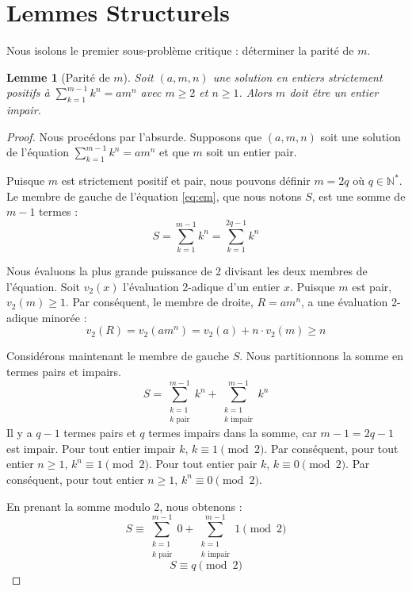 \documentclass[11pt,a4paper]{article}
\newtheorem{lemma}{Lemme}
\begin{document}
\section{Lemmes Structurels}

Nous isolons le premier sous-problème critique : déterminer la parité de $m$.

\begin{lemma}[Parité de $m$]
\label{lem:parity}
Soit $(a, m, n)$ une solution en entiers strictement positifs à $\sum_{k=1}^{m-1} k^n = a m^n$ avec $m \ge 2$ et $n \ge 1$. Alors $m$ doit être un entier impair.
\end{lemma}

\begin{proof}
Nous procédons par l'absurde. Supposons que $(a, m, n)$ soit une solution de l'équation $\sum_{k=1}^{m-1} k^n = a m^n$ et que $m$ soit un entier pair.

Puisque $m$ est strictement positif et pair, nous pouvons définir $m = 2q$ où $q \in \mathbb{N}^*$.
Le membre de gauche de l'équation \eqref{eq:em}, que nous notons $S$, est une somme de $m-1$ termes :
\begin{equation}
S = \sum_{k=1}^{m-1} k^n = \sum_{k=1}^{2q-1} k^n
\end{equation}

Nous évaluons la plus grande puissance de 2 divisant les deux membres de l'équation.
Soit $v_2(x)$ l'évaluation 2-adique d'un entier $x$.
Puisque $m$ est pair, $v_2(m) \ge 1$. Par conséquent, le membre de droite, $R = a m^n$, a une évaluation 2-adique minorée :
\begin{equation}
v_2(R) = v_2(a m^n) = v_2(a) + n \cdot v_2(m) \ge n
\end{equation}

Considérons maintenant le membre de gauche $S$. Nous partitionnons la somme en termes pairs et impairs.
\begin{equation}
S = \sum_{\substack{k=1 \\ k \text{ pair}}}^{m-1} k^n + \sum_{\substack{k=1 \\ k \text{ impair}}}^{m-1} k^n
\end{equation}
Il y a $q-1$ termes pairs et $q$ termes impairs dans la somme, car $m-1 = 2q-1$ est impair.
Pour tout entier impair $k$, $k \equiv 1 \pmod 2$. Par conséquent, pour tout entier $n \ge 1$, $k^n \equiv 1 \pmod 2$.
Pour tout entier pair $k$, $k \equiv 0 \pmod 2$. Par conséquent, pour tout entier $n \ge 1$, $k^n \equiv 0 \pmod 2$.

En prenant la somme modulo 2, nous obtenons :
\begin{equation}
S \equiv \sum_{\substack{k=1 \\ k \text{ pair}}}^{m-1} 0 + \sum_{\substack{k=1 \\ k \text{ impair}}}^{m-1} 1 \pmod 2
\end{equation}
\begin{equation}
S \equiv q \pmod 2
\end{equation}


\end{proof}
\end{document}
